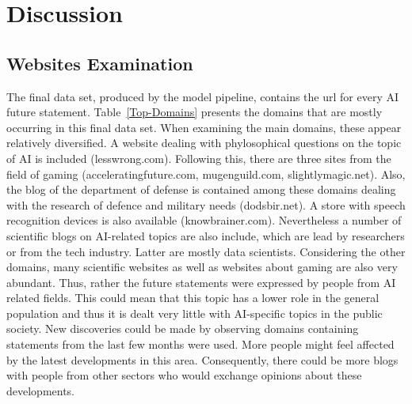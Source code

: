 \section{Discussion}

\subsection{Websites Examination}

The final data set, produced by the model pipeline, contains the url for every AI future statement.
Table~\ref{Top-Domains} presents the domains that are mostly occurring in this final data set.
When examining the main domains, these appear relatively  diversified.
A website dealing with phylosophical questions on the topic of AI is included (lesswrong.com).
Following this, there are three sites from the field of gaming (acceleratingfuture.com, mugenguild.com, slightlymagic.net).
Also, the blog of the department of defense is contained among these domains dealing with the research of defence and military needs (dodsbir.net).
A store with speech recognition devices is also available (knowbrainer.com).
Nevertheless a number of scientific blogs on AI-related topics are also include, which are lead by researchers or from the tech industry.
Latter are mostly data scientists.
Considering the other domains, many scientific websites as well as websites about gaming are also very abundant.
Thus, rather the future statements were expressed by people from AI related fields.
This could mean that this topic has a lower role in the general population and thus it is dealt very little with AI-specific topics in the public society.
New discoveries could be made by observing domains containing statements from the last few months were used.
More people might feel affected by the latest developments in this area.
Consequently, there could be more blogs with people from other sectors who would exchange opinions about these developments.

